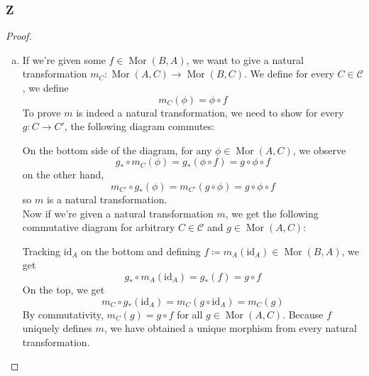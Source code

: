 \documentclass{article}
\newcommand{\id}{\mathrm{id}}
\newcommand{\fC}{\mathscr{C}}
\DeclareMathOperator{\Mor}{Mor}
\begin{document}
\subsubsection{Z}\label{1.3.Z}
\begin{proof}
    \begin{enumerate}[(a)]
        \item If we're given some $f\in \Mor(B,A)$, we want to give a natural transformation $m_C:\Mor(A,C)\to \Mor(B,C)$. We define for every $C\in \fC$, we define
        \[
        m_C(\phi)=\phi\circ f
        \]
        To prove $m$ is indeed a natural transformation, we need to show for every $g:C\to C'$, the following diagram commutes:
        \begin{center}
        \end{center}
        On the bottom side of the diagram, for any $\phi\in \Mor(A,C)$, we observe
        \[
        g_*\circ m_C(\phi)=g_*(\phi\circ f)=g\circ \phi\circ f
        \]
        on the other hand,
        \[
        m_{C'}\circ g_*(\phi)=m_{C'}(g\circ \phi)=g\circ \phi \circ f
        \]
        so $m$ is a natural transformation.\\
        \newline
        Now if we're given a natural transformation $m$, we get the following commutative diagram for arbitrary $C\in \fC$ and $g\in \Mor(A,C)$:
        \begin{center}
        \end{center}
        Tracking $\id_A$ on the bottom and defining $f\coloneqq m_A(\id_A)\in \Mor(B,A)$, we get
        \[
        g_*\circ m_A(\id_A)=g_*(f)=g\circ f
        \]
        On the top, we get
        \[
        m_C\circ g_*(\id_A)=m_C(g\circ \id_A)=m_C(g)
        \]
        By commutativity, $m_C(g)=g\circ f$ for all $g\in \Mor(A,C)$. Because $f$ uniquely defines $m$, we have obtained a unique morphism from every natural transformation.\\

\end{enumerate}
\end{proof}
\end{document}
